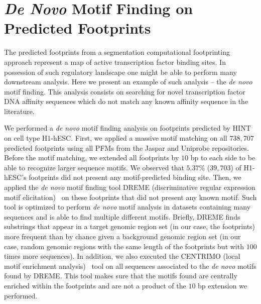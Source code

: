 






















\section{\emph{De Novo} Motif Finding on Predicted Footprints}
\label{sec:denovo.motif.finding.footprints}

The predicted footprints from a segmentation computational footprinting approach represent a map of active transcription factor binding sites. In possession of such regulatory landscape one might be able to perform many downstream analysis. Here we present an example of such analysis -- the \emph{de novo} motif finding. This analysis consists on searching for novel transcription factor DNA affinity sequences which do not match any known affinity sequence in the literature.

We performed a \emph{de novo} motif finding analysis on footprints predicted by HINT on cell type H1-hESC. First, we applied a massive motif matching on all $738,707$ predicted footprints using all PFMs from the Jaspar and Uniprobe repositories. Before the motif matching, we extended all footprints by $10$ bp to each side to be able to recognize larger sequence motifs. We observed that \approxy$5.37\%$ ($39,703$) of H1-hESC's footprints did not present any motif-predicted binding site. Then, we applied the \emph{de novo} motif finding tool DREME (discriminative regular expression motif elicitation)~\cite{bailey2011} on these footprints that did not present any known motif. Such tool is optimized to perform \emph{de novo} motif analysis in datasets containing many sequences and is able to find multiple different motifs. Briefly, DREME finds substrings that appear in a target genomic region set (in our case, the footprints) more frequent than by chance given a background genomic region set (in our case, random genomic regions with the same length of the footprints but with $100$ times more sequences). In addition, we also executed the CENTRIMO (local motif enrichment analysis)~\cite{bailey2012} tool on all sequences associated to the \emph{de novo} motifs found by DREME. This tool makes sure that the motifs found are centrally enriched within the footprints and are not a product of the $10$ bp extension we performed.

